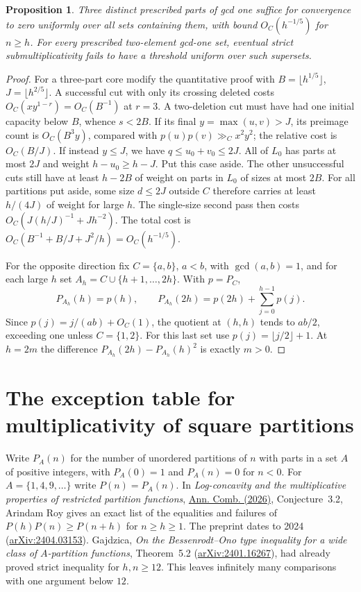 \documentclass[11pt,a4paper]{article}
\newtheorem{proposition}[theorem]{Proposition}
\numberwithin{equation}{section}
\begin{document}
\begin{proposition}\label{th:three-core}
Three distinct prescribed parts of gcd one suffice for convergence
to zero uniformly over all sets containing them, with bound
$O_C(h^{-1/5})$ for $n\ge h$. For every prescribed two-element
gcd-one set, eventual strict submultiplicativity fails to have
a threshold uniform over such supersets.
\end{proposition}
\begin{proof}
For a three-part core modify the quantitative proof with
$B=\lfloor h^{1/5}\rfloor$, $J=\lfloor h^{2/5}\rfloor$.
A successful cut with only its crossing deleted costs
$O_C(xy^{1-r})=O_C(B^{-1})$ at $r=3$. A two-deletion cut must
have had one initial capacity below $B$, whence $s<2B$.
If its final $y=\max(u,v)>J$, its preimage count is
$O_C(B^3 y)$, compared with $p(u)p(v)\gg_C x^2y^2$; the
relative cost is $O_C(B/J)$. If instead $y\le J$, we have
$q\le u_0+v_0\le2J$. All of $L_0$ has parts at most $2J$ and
weight $h-u_0\ge h-J$. Put this case aside.
The other unsuccessful cuts still have at least $h-2B$ of weight
on parts in $L_0$ of sizes at most $2B$. For all partitions put
aside, some size $d\le 2J$ outside $C$ therefore carries at least
$h/(4J)$ of weight for large $h$. The single-size second pass
then costs $O_C(J(h/J)^{-1}+Jh^{-2})$. The total cost is
$O_C(B^{-1}+B/J+J^2/h)=O_C(h^{-1/5})$.

For the opposite direction fix $C=\{a,b\}$, $a<b$, with
$\gcd(a,b)=1$, and for each large $h$ set
$A_h=C\cup\{h+1,\ldots,2h\}$. With $p=P_C$,
\[
 P_{A_h}(h)=p(h),\qquad
 P_{A_h}(2h)=p(2h)+\sum_{j=0}^{h-1}p(j).
\]
Since $p(j)=j/(ab)+O_C(1)$, the quotient at $(h,h)$ tends
to $ab/2$, exceeding one unless $C=\{1,2\}$. For this last set
use $p(j)=\lfloor j/2\rfloor+1$. At $h=2m$ the difference
$P_{A_h}(2h)-P_{A_h}(h)^2$ is exactly $m>0$.
\end{proof}

\section{The exception table for multiplicativity of square partitions}
\label{sec:roy-squares}
Write $P_A(n)$ for the number of unordered partitions of $n$ with parts
in a set $A$ of positive integers, with $P_A(0)=1$ and $P_A(n)=0$ for
$n<0$. For $A=\{1,4,9,\ldots\}$ write $P(n)=P_A(n)$. In
\emph{Log-concavity and the multiplicative properties of restricted
partition functions}, \href{https://doi.org/10.1007/s00026-026-00847-5}
{Ann. Comb. (2026)}, Conjecture~3.2, Arindam Roy gives an exact list of
the equalities and failures of $P(h)P(n)\ge P(n+h)$ for $n\ge h\ge1$.
The preprint dates to 2024 (\href{https://arxiv.org/abs/2404.03153}
{arXiv:2404.03153}). Gajdzica, \emph{On the Bessenrodt--Ono type
inequality for a wide class of $A$-partition functions}, Theorem~5.2
(\href{https://arxiv.org/abs/2401.16267}{arXiv:2401.16267}), had already
proved strict inequality for $h,n\ge12$. This leaves infinitely many
comparisons with one argument below $12$.
\end{document}
